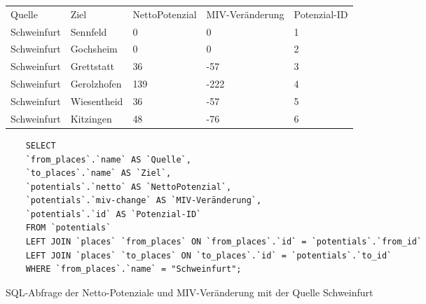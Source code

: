 \begin{tabular}{ l  l  l  l  l }
Quelle & Ziel & NettoPotenzial & MIV-Veränderung & Potenzial-ID\\
Schweinfurt & Sennfeld & 0 & 0 & 1\\ 
Schweinfurt & Gochsheim & 0 & 0 & 2\\ 
Schweinfurt & Grettstatt & 36 & -57 & 3\\ 
Schweinfurt & Gerolzhofen & 139 & -222 & 4\\ 
Schweinfurt & Wiesentheid & 36 & -57 & 5\\ 
Schweinfurt & Kitzingen & 48 & -76 & 6\\ 
\end{tabular}
\newline
\newline
\begin{listing}[htbp]
    \begin{verbatim}
    SELECT
    `from_places`.`name` AS `Quelle`, 
    `to_places`.`name` AS `Ziel`, 
    `potentials`.`netto` AS `NettoPotenzial`, 
    `potentials`.`miv-change` AS `MIV-Veränderung`, 
    `potentials`.`id` AS `Potenzial-ID`
    FROM `potentials`
    LEFT JOIN `places` `from_places` ON `from_places`.`id` = `potentials`.`from_id`
    LEFT JOIN `places` `to_places` ON `to_places`.`id` = `potentials`.`to_id`
    WHERE `from_places`.`name` = "Schweinfurt";
    \end{verbatim}
    \caption{SQL-Abfrage der Netto-Potenziale und MIV-Veränderung mit der Quelle Schweinfurt}\label{lst-fz-schweinfurt}
\end{listing}